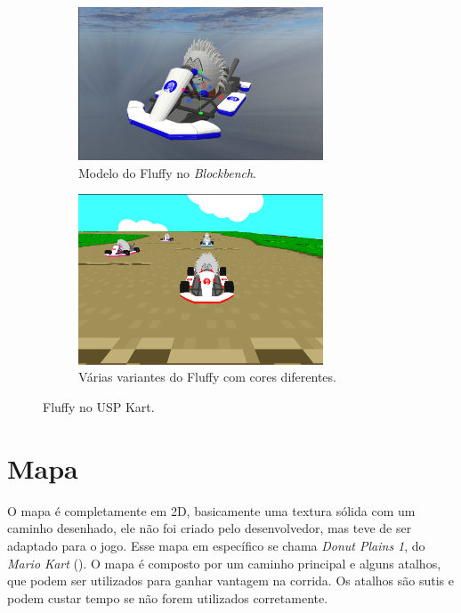 \begin{figure}[H]
    \centering
    \begin{subfigure}[b]{1\textwidth}
        \centering
        \includegraphics[width=0.8\textwidth]{figuras/Fluffy.png}
        \caption{Modelo do Fluffy no \textit{Blockbench}.}
        \label{fig:fluffy-blockbench}
    \end{subfigure}
    \begin{subfigure}[b]{1\textwidth}
        \centering
        \includegraphics[width=0.8\textwidth]{figuras/USP Kart.png}
        \caption{Várias variantes do Fluffy com cores diferentes.}
        \label{fig:fluffy-variantes}
    \end{subfigure}
    \caption{Fluffy no USP Kart.}
    \label{fig:fluffy}
\end{figure}

\section{Mapa}

O mapa é completamente em 2D, basicamente uma textura sólida com um caminho desenhado, ele não foi criado pelo desenvolvedor, mas teve de ser adaptado para o jogo. Esse mapa em específico se chama \textit{Donut Plains 1}, do \textit{Mario Kart} (\cite{marioKart}). O mapa é composto por um caminho principal e alguns atalhos, que podem ser utilizados para ganhar vantagem na corrida. Os atalhos são sutis e podem custar tempo se não forem utilizados corretamente.

